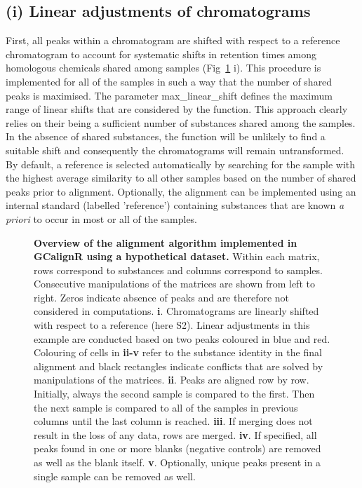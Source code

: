 \documentclass[10pt,letterpaper]{article}
\begin{document}
\subsection*{(i) Linear adjustments of chromatograms}
First, all peaks within a chromatogram are shifted with respect to a reference chromatogram to account for systematic shifts in retention times among homologous chemicals shared among samples (Fig~\ref{Fig:Fig2} i). This procedure is implemented for all of the samples in such a way that the number of shared peaks is maximised. The parameter max\_linear\_shift defines the maximum range of linear shifts that are considered by the function. This approach clearly relies on their being a sufficient number of substances shared among the samples. In the absence of shared substances, the function will be unlikely to find a suitable shift and consequently the chromatograms will remain untransformed. By default, a reference is selected automatically by searching for the sample with the highest average similarity to all other samples based on the number of shared peaks prior to alignment. Optionally, the alignment can be implemented using an internal standard (labelled 'reference') containing substances that are known \textit{a priori} to occur in most or all of the samples.

\begin{figure}[htbp]
\centering
\caption{\textbf{Overview of the alignment algorithm implemented in GCalignR using a hypothetical dataset.}
Within each matrix, rows correspond to substances and columns correspond to samples. Consecutive manipulations of the matrices are shown from left to right. Zeros indicate absence of peaks and are therefore not considered in computations. \textbf{i}. Chromatograms are linearly shifted with respect to a reference (here S2). Linear adjustments in this example are conducted based on two peaks coloured in blue and red. Colouring of cells in \textbf{ii-v} refer to the substance identity in the final alignment and black rectangles indicate conflicts that are solved by manipulations of the matrices. \textbf{ii}. Peaks are aligned row by row. Initially, always the second sample is compared to the first. Then the next sample is compared to all of the samples in previous columns until the last column is reached. \textbf{iii}. If merging does not result in the loss of any data, rows are merged. \textbf{iv}. If specified, all peaks found in one or more blanks (negative controls) are removed as well as the blank itself. \textbf{v}. Optionally, unique peaks present in a single sample can be removed as well.}
\label{Fig:Fig2}
\end{figure}
\end{document}
